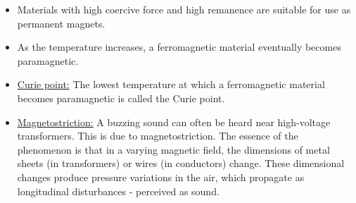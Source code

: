 \documentclass[t,aspectratio=169,xcolor=dvipsnames]{beamer}
\begin{document}
\begin{frame}
\begin{itemize}
\pagebreak
\item Materials with high coercive force and high remanence are suitable for use as permanent magnets.
\item As the temperature increases, a ferromagnetic material eventually becomes paramagnetic.
\item \underline{Curie point:} The lowest temperature at which a ferromagnetic material becomes paramagnetic is called the Curie point.
\item \underline{Magnetostriction:} A buzzing sound can often be heard near high-voltage transformers. This is due to magnetostriction. The essence of the phenomenon is that in a varying magnetic field, the dimensions of metal sheets (in transformers) or wires (in conductors) change. These dimensional changes produce pressure variations in the air, which propagate as longitudinal disturbances - perceived as sound.
\end{itemize}
\end{frame}

\end{document}
